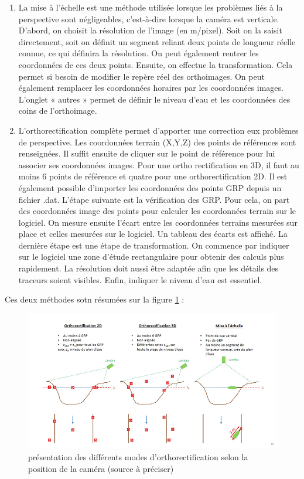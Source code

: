 \documentclass[
]{article}
\begin{document}
\begin{enumerate}
\def\labelenumi{\arabic{enumi}.}
\item
  La mise à l'échelle est une méthode utilisée lorsque les problèmes liés à la perspective sont négligeables, c'est-à-dire lorsque la caméra est verticale. D'abord, on choisit la résolution de l'image (en m/pixel). Soit on la saisit directement, soit on définit un segment reliant deux points de longueur réelle connue, ce qui définira la résolution. On peut également rentrer les coordonnées de ces deux points. Ensuite, on effectue la transformation. Cela permet si besoin de modifier le repère réel des orthoimages. On peut également remplacer les coordonnées horaires par les coordonnées images. L'onglet « autres » permet de définir le niveau d'eau et les coordonnées des coins de l'orthoimage.
\item
  L'orthorectification complète permet d'apporter une correction eux problèmes de perspective. Les coordonnées terrain (X,Y,Z) des points de références sont renseignées. Il suffit ensuite de cliquer sur le point de référence pour lui associer ses coordonnées images. Pour une ortho rectification en 3D, il faut au moins 6 points de référence et quatre pour une orthorectification 2D. Il est également possible d'importer les coordonnées des points GRP depuis un fichier .dat. L'étape suivante est la vérification des GRP. Pour cela, on part des coordonnées image des points pour calculer les coordonnées terrain sur le logiciel. On mesure ensuite l'écart entre les coordonnées terrains mesurées sur place et celles mesurées sur le logiciel. Un tableau des écarts est affiché. La dernière étape est une étape de transformation. On commence par indiquer sur le logiciel une zone d'étude rectangulaire pour obtenir des calculs plus rapidement. La résolution doit aussi être adaptée afin que les détails des traceurs soient visibles. Enfin, indiquer le niveau d'eau est essentiel.
\end{enumerate}

Ces deux méthodes sotn résumées sur la figure \ref{fig:orthowang} :



\begin{figure}[H]
\includegraphics[width=1\linewidth,]{images/Orthowang} \caption{présentation des différents modes d'orthorectification selon la position de la caméra (source à préciser)}\label{fig:orthowang}
\end{figure}
\end{document}
